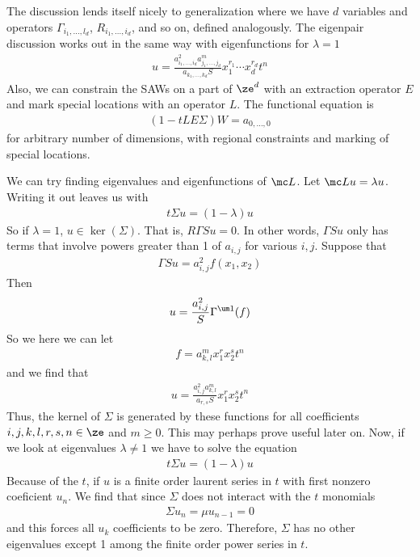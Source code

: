 The discussion lends itself nicely to generalization where we have $d$ variables and operators $\Gamma_{i_1,\ldots,l_d}$, $R_{i_1,\ldots,i_d}$, and so on, defined analogously. The eigenpair discussion works out in the same way with eigenfunctions for $\lambda = 1$
\begin{align}
	u = \frac{a_{i_1,\ldots,i_d}^2 a_{j_1,\ldots,j_d}^m}{a_{k_1,\ldots,k_d}S}x_1^{r_1}\cdots x_d^{r_d} t^n
\end{align}
Also, we can constrain the SAWs on a part of $\ze^d$ with an extraction operator $E$ and mark special locations with an operator $L$. The functional equation is
\begin{align}
	(1- tLE\Sigma)W = a_{0,\ldots,0}
\end{align}
for arbitrary number of dimensions, with regional constraints and marking of special locations.

We can try finding eigenvalues and eigenfunctions of $\mc L$. Let $\mc Lu = \lambda u$. Writing it out leaves us with
\begin{align}
	t\Sigma u = (1-\lambda)u
\end{align}
So if $\lambda = 1$, $u\in \ker(\Sigma)$. That is, $R\Gamma S u = 0$. In other words, $\Gamma S u$ only has terms that involve powers greater than 1 of $a_{i,j}$ for various $i,j$. Suppose that
\begin{align}
	\Gamma S u = a_{i,j}^2 f(x_1,x_2)
\end{align}
Then
\begin{align}
	u  = \frac{a_{i,j}^2}{S}\Gamma^{\um 1}(f)
\end{align}
So we here we can let
\begin{align}
		f = a_{k,l}^m x_1^rx_2^s t^n
\end{align}
and we find that
\begin{align}
	u =  \frac{a_{i,j}^2 a_{k,l}^m}{a_{r,s}S}x_1^r x_2^s t^n
\end{align}
Thus, the kernel of $\Sigma$ is generated by these functions for all coefficients $i,j,k,l,r,s,n \in \ze$ and $m\ge 0$. This may perhaps prove useful later on. Now, if we look at eigenvalues $\lambda \neq 1$ we have to solve the equation
\begin{align}
	t \Sigma u = (1-\lambda) u
\end{align}
Because of the $t$, if $u$ is a finite order laurent series in $t$ with first nonzero coeficient $u_n$. We find that since $\Sigma$ does not interact with the $t$ monomials
\begin{align}
	\Sigma u_n = \mu u_{n-1} = 0
\end{align}
and this forces all $u_k$ coefficients to be zero. Therefore, $\Sigma$ has no other eigenvalues except 1 among the finite order power series in $t$.



\endinput
